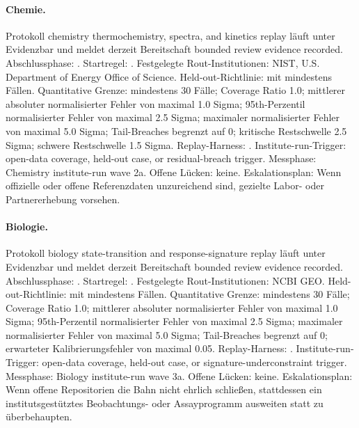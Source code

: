\paragraph{Chemie.}
Protokoll chemistry thermochemistry, spectra, and kinetics replay läuft unter Evidenzbar  und meldet derzeit Bereitschaft bounded review evidence recorded.
Abschlussphase: . Startregel: .
Festgelegte Rout-Institutionen: NIST, \allowbreak U.S. Department of Energy Office of Science.
Held-out-Richtlinie:  mit mindestens  Fällen.
Quantitative Grenze: mindestens 30 Fälle; Coverage Ratio 1.0; mittlerer absoluter normalisierter Fehler von maximal 1.0 Sigma; 95th-Perzentil normalisierter Fehler von maximal 2.5 Sigma; maximaler normalisierter Fehler von maximal 5.0 Sigma; Tail-Breaches begrenzt auf 0; kritische Restschwelle 2.5 Sigma; schwere Restschwelle 1.5 Sigma.
Replay-Harness: .
Institute-run-Trigger: open-data coverage, held-out case, or residual-breach trigger. Messphase: Chemistry institute-run wave 2a.
Offene Lücken: keine.
Eskalationsplan: Wenn offizielle oder offene Referenzdaten unzureichend sind, gezielte Labor- oder Partnererhebung vorsehen.

\paragraph{Biologie.}
Protokoll biology state-transition and response-signature replay läuft unter Evidenzbar  und meldet derzeit Bereitschaft bounded review evidence recorded.
Abschlussphase: . Startregel: .
Festgelegte Rout-Institutionen: NCBI GEO.
Held-out-Richtlinie:  mit mindestens  Fällen.
Quantitative Grenze: mindestens 30 Fälle; Coverage Ratio 1.0; mittlerer absoluter normalisierter Fehler von maximal 1.0 Sigma; 95th-Perzentil normalisierter Fehler von maximal 2.5 Sigma; maximaler normalisierter Fehler von maximal 5.0 Sigma; Tail-Breaches begrenzt auf 0; erwarteter Kalibrierungsfehler von maximal 0.05.
Replay-Harness: .
Institute-run-Trigger: open-data coverage, held-out case, or signature-underconstraint trigger. Messphase: Biology institute-run wave 3a.
Offene Lücken: keine.
Eskalationsplan: Wenn offene Repositorien die Bahn nicht ehrlich schließen, stattdessen ein institutsgestütztes Beobachtungs- oder Assayprogramm ausweiten statt zu überbehaupten.

